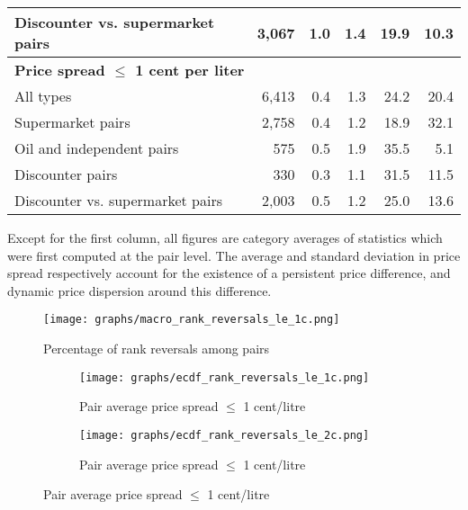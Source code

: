 \documentclass[english]{article}
\begin{document}
\begin{table}[H]
\begin{threeparttable}
\begin{tabular}{lrrrrr}
Discounter vs. supermarket pairs & 3,067 & 1.0   & 1.4   & 19.9  & 10.3 \\
\hline
\multicolumn{2}{l}{\textbf{Price spread $\le$ 1 cent per liter}} &       &       &       &  \\
All types & 6,413 & 0.4   & 1.3   & 24.2  & 20.4 \\
Supermarket pairs & 2,758 & 0.4   & 1.2   & 18.9  & 32.1 \\
Oil and independent pairs & 575   & 0.5   & 1.9   & 35.5  & 5.1 \\
Discounter pairs & 330   & 0.3   & 1.1   & 31.5  & 11.5 \\
Discounter vs. supermarket pairs & 2,003 & 0.5   & 1.2   & 25.0  & 13.6 \\
\hline
\hline
\end{tabular}
\begin{tablenotes}
			\small
      \item Except for the first column, all figures are category averages of statistics which were first computed at the pair level. The average and standard deviation in price spread respectively account for the existence of a persistent price difference, and dynamic price dispersion around this difference.
\end{tablenotes}
\end{threeparttable}
\end{table}

\begin{figure}[H]
    \caption{Percentage of rank reversals among pairs}
	\centering
		\texttt{[image: graphs/macro\_rank\_reversals\_le\_1c.png]}
\end{figure}

\begin{figure}[H]
\centering
\caption{Empirical distribution functions of rank reversals (raw prices)}
\begin{subfigure}{.4\linewidth}
\centering
\texttt{[image: graphs/ecdf\_rank\_reversals\_le\_1c.png]}
\caption[short]{Pair average price spread $\le$ 1 cent/litre}
\end{subfigure}
\begin{subfigure}{.4\linewidth}
\centering
\texttt{[image: graphs/ecdf\_rank\_reversals\_le\_2c.png]}
\caption[short]{Pair average price spread $\le$ 1 cent/litre}
\end{subfigure}
\end{figure}
\end{document}
